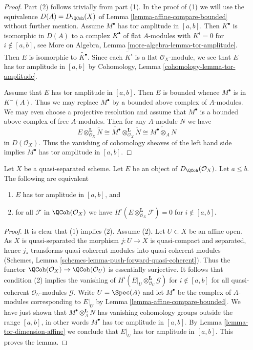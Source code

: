 \begin{proof}
Part (2) follows trivially from part (1). In the proof of (1) we will
use the equivalence $D(A) = D_\QCoh(X)$ of
Lemma \ref{lemma-affine-compare-bounded}
without further mention.
Assume $M^\bullet$ has tor amplitude in $[a, b]$. Then $K^\bullet$
is isomorphic in $D(A)$ to a complex $K^\bullet$ of flat $A$-modules
with $K^i = 0$ for $i \not \in [a, b]$, see
More on Algebra, Lemma \ref{more-algebra-lemma-tor-amplitude}.
Then $E$ is isomorphic to $\widetilde{K^\bullet}$. Since each
$\widetilde{K^i}$ is a flat $\mathcal{O}_X$-module, we see
that $E$ has tor amplitude in $[a, b]$ by
Cohomology, Lemma \ref{cohomology-lemma-tor-amplitude}.

\medskip\noindent
Assume that $E$ has tor amplitude in $[a, b]$. Then $E$ is bounded
whence $M^\bullet$ is in $K^-(A)$. Thus we may replace $M^\bullet$
by a bounded above complex of $A$-modules. We may even choose
a projective resolution and assume that $M^\bullet$ is a bounded above
complex of free $A$-modules. Then for any $A$-module $N$ we have
$$
E \otimes_{\mathcal{O}_X}^\mathbf{L} \widetilde{N}
\cong
\widetilde{M^\bullet} \otimes_{\mathcal{O}_X}^\mathbf{L} \widetilde{N}
\cong
\widetilde{M^\bullet \otimes_A N}
$$
in $D(\mathcal{O}_X)$. Thus the vanishing of cohomology sheaves of
the left hand side implies $M^\bullet$ has tor amplitude in $[a, b]$.
\end{proof}

\begin{lemma}
\label{lemma-tor-qc-qs}
Let $X$ be a quasi-separated scheme. Let $E$ be an object
of $D_\QCoh(\mathcal{O}_X)$. Let $a \leq b$. The
following are equivalent
\begin{enumerate}
\item $E$ has tor amplitude in $[a, b]$, and
\item for all $\mathcal{F}$ in $\QCoh(\mathcal{O}_X)$
we have $H^i(E \otimes_{\mathcal{O}_X}^\mathbf{L} \mathcal{F}) = 0$
for $i \not \in [a, b]$.
\end{enumerate}
\end{lemma}

\begin{proof}
It is clear that (1) implies (2). Assume (2). Let $U \subset X$ be
an affine open. As $X$ is quasi-separated the morphism $j : U \to X$
is quasi-compact and separated, hence $j_*$ transforms quasi-coherent
modules into quasi-coherent modules
(Schemes, Lemma \ref{schemes-lemma-push-forward-quasi-coherent}).
Thus the functor
$\QCoh(\mathcal{O}_X) \to \QCoh(\mathcal{O}_U)$
is essentially surjective. It follows that condition (2)
implies the vanishing of
$H^i(E|_U \otimes_{\mathcal{O}_U}^\mathbf{L} \mathcal{G})$
for $i \not \in [a, b]$ for all quasi-coherent $\mathcal{O}_U$-modules
$\mathcal{G}$. Write $U = \Spec(A)$ and let $M^\bullet$ be the
complex of $A$-modules corresponding to $E|_U$ by
Lemma \ref{lemma-affine-compare-bounded}.
We have just shown that $M^\bullet \otimes_A^\mathbf{L} N$
has vanishing cohomology groups outside the range $[a, b]$,
in other words $M^\bullet$ has tor amplitude in $[a, b]$.
By Lemma \ref{lemma-tor-dimension-affine}
we conclude that $E|_U$ has tor amplitude in $[a, b]$.
This proves the lemma.
\end{proof}


